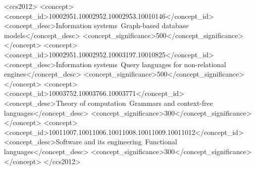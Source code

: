 \documentclass[sigconf,table,anonymous]{acmart}
\begin{document}
\begin{CCSXML}
<ccs2012>
<concept>
<concept_id>10002951.10002952.10002953.10010146</concept_id>
<concept_desc>Information systems~Graph-based database models</concept_desc>
<concept_significance>500</concept_significance>
</concept>
<concept>
<concept_id>10002951.10002952.10003197.10010825</concept_id>
<concept_desc>Information systems~Query languages for non-relational engines</concept_desc>
<concept_significance>500</concept_significance>
</concept>
<concept>
<concept_id>10003752.10003766.10003771</concept_id>
<concept_desc>Theory of computation~Grammars and context-free languages</concept_desc>
<concept_significance>300</concept_significance>
</concept>
<concept>
<concept_id>10011007.10011006.10011008.10011009.10011012</concept_id>
<concept_desc>Software and its engineering~Functional languages</concept_desc>
<concept_significance>300</concept_significance>
</concept>
</ccs2012>
\end{CCSXML}





\maketitle
\end{document}

